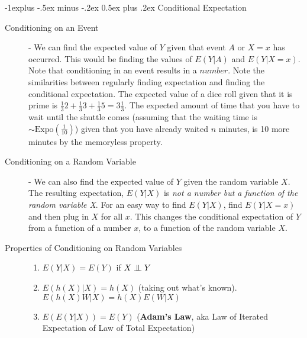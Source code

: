 \documentclass[10pt,landscape]{article}
\makeatletter
\newcommand\independent{\protect\mathpalette{\protect\independenT}{\perp}}
\def\independenT#1#2{\mathrel{\setbox0\hbox{$#1#2$}%
    \copy0\kern-\wd0\mkern4mu\box0}}
\newcommand{\Expo}{\textrm{Expo}}
\renewcommand{\subsection}{\@startsection{subsection}{2}{0mm}%
                                {-1explus -.5ex minus -.2ex}%
                                {0.5ex plus .2ex}%
                                {\normalfont\normalsize\bfseries}}
\makeatother
\begin{document}
\begin{multicols}{3}
\subsection{Conditional Expectation}
\begin{description}
    \item[Conditioning on an Event] - We can find the expected value of $Y$ given that event $A$ or $X=x$ has occurred. This would be finding the values of $E(Y|A)$ and $E(Y|X = x)$. Note that conditioning in an event results in a $number$. Note the similarities between regularly finding expectation and finding the conditional expectation. The expected value of a dice roll given that it is prime is $\frac{1}{3}2 + \frac{1}{3}3 + \frac{1}{3}5 = 3\frac{1}{3}$. The expected amount of time that you have to wait until the shuttle comes (assuming that the waiting time is $\sim \Expo(\frac{1}{10})$) given that you have already waited $n$ minutes, is 10 more minutes by the memoryless property.
\end{description}
\begin{description}
    \item[Conditioning on a Random Variable] - We can also find the expected value of $Y$ given the random variable $X$. The resulting expectation, $E(Y|X)$ is \emph{not a number but a function of the random variable X}. For an easy way to find $E(Y|X)$, find $E(Y|X = x)$ and then plug in $X$ for all $x$. This changes the conditional expectation of $Y$ from a function of a number $x$, to a function of the random variable $X$.
    \item[Properties of Conditioning on Random Variables] \quad
    \begin{enumerate}
        \item $E(Y|X) = E(Y)$ if $X \independent Y$
        \item $E(h(X)|X) = h(X)$ (taking out what's known). \\
            $E(h(X)W|X) = h(X)E(W|X)$
        \item $E(E(Y|X)) = E(Y)$ (\textbf{Adam's Law}, aka Law of Iterated Expectation of Law of Total Expectation)
    \end{enumerate}


\end{description}
\end{multicols}
\end{document}
